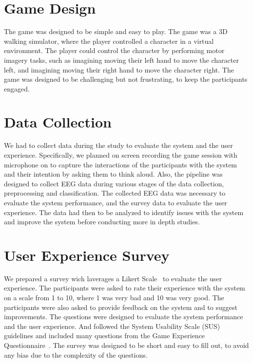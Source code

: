 \section{Game Design}
The game was designed to be simple and easy to play.
The game was a 3D walking simulator, where the player controlled a character in a virtual environment.
The player could control the character by performing motor imagery tasks, such as imagining moving their left hand to move the character left, and imagining moving their right hand to move the character right.
The game was designed to be challenging but not frustrating, to keep the participants engaged.

\section{Data Collection}
We had to collect data during the study to evaluate the system and the user experience.
Specifically, we planned on screen recording the game session with microphone on to capture the interactions of the participants with the system and their intention by asking them to think aloud.
Also, the pipeline was designed to collect EEG data during various stages of the data collection, preprocessing and classification.
The collected EEG data was necessary to evaluate the system performance, and the survey data to evaluate the user experience.
The data had then to be analyzed to identify issues with the system and improve the system before conducting more in depth studies.

\section{User Experience Survey}
We prepared a survey wich laverages a Likert Scale~\cite{likert1932technique} to evaluate the user experience.
The participants were asked to rate their experience with the system on a scale from 1 to 10, where 1 was very bad and 10 was very good.
The participants were also asked to provide feedback on the system and to suggest improvements.
The questions were designed to evaluate the system performance and the user experience.
And followed the System Usability Scale (SUS)~\cite{brooke1996sus} guidelines and included many questions from the Game Experience Questionnaire~\cite{ijsselsteijn2013game}.
The survey was designed to be short and easy to fill out, to avoid any bias due to the complexity of the questions.

